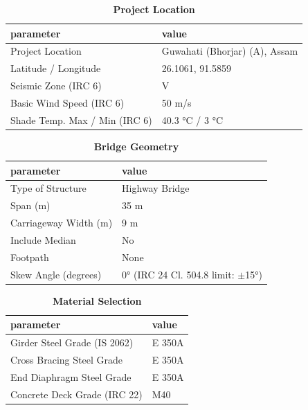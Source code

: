 \documentclass[12pt,a4paper]{report}
\numberwithin{table}{chapter}
\numberwithin{figure}{chapter}
\begin{document}
\begin{table}[H]
\caption{\textbf{Project Location}}
\label{subsec:project-location}
\begin{tabular}{|L{5.5cm}|L{8.5cm}|}
\hline
\textbf{parameter} & \textbf{value} \\
\hline
\textnormal{Project Location} & Guwahati (Bhorjar) (A), Assam \\
\hline
\textnormal{Latitude / Longitude} & 26.1061, 91.5859 \\
\hline
\textnormal{Seismic Zone (IRC 6)} & V \\
\hline
\textnormal{Basic Wind Speed (IRC 6)} & 50 m/s \\
\hline
\textnormal{Shade Temp. Max / Min (IRC 6)} & 40.3 °C / 3 °C \\
\hline
\end{tabular}
\vspace{0.4cm}
\end{table}

\begin{table}[H]
\caption{\textbf{Bridge Geometry}}
\label{subsec:bridge-geometry}
\begin{tabular}{|L{5.5cm}|L{8.5cm}|}
\hline
\textbf{parameter} & \textbf{value} \\
\hline
\textnormal{Type of Structure} & Highway Bridge \\
\hline
\textnormal{Span (m)} & 35 m \\
\hline
\textnormal{Carriageway Width (m)} & 9 m \\
\hline
\textnormal{Include Median} & No \\
\hline
\textnormal{Footpath} & None \\
\hline
\textnormal{Skew Angle (degrees)} & 0° (IRC 24 Cl. 504.8 limit: $\pm$15°) \\
\hline
\end{tabular}
\end{table}
\vspace{0.4cm}

\begin{table}[H]
\caption{\textbf{Material Selection}}
\label{subsec:material}
\begin{tabular}{|L{5.5cm}|L{8.5cm}|}
\hline
\textbf{parameter} & \textbf{value} \\
\hline
\textnormal{Girder Steel Grade (IS 2062)} & E 350A \\
\hline
\textnormal{Cross Bracing Steel Grade} & E 350A \\
\hline
\textnormal{End Diaphragm Steel Grade} & E 350A \\
\hline
\textnormal{Concrete Deck Grade (IRC 22)} & M40 \\
\hline
\end{tabular}
\end{table}
\vspace{0.4cm}
\end{document}
